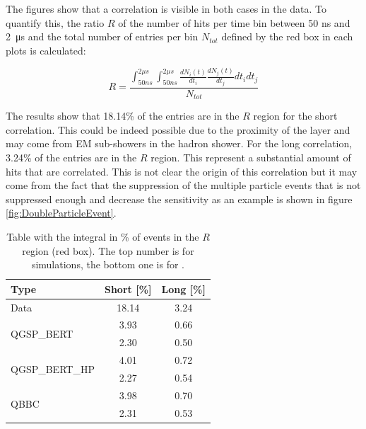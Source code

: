 The figures show that a correlation is visible in both cases in the data. To quantify this, the ratio $R$ of the number of hits per time bin between 50 ns and \SI{2}{\micro\second} and the total number of entries per bin $N_{tot}$ defined by the red box in each plots is calculated:

\begin{equation}
	R = \frac{\int_{50 ns}^{2 \mu s} \int_{50 ns}^{2 \mu s} \frac{dN_i(t)}{dt_i} \frac{dN_j(t)}{dt_j} dt_i dt_j}{N_{tot}}
\end{equation}

The results show that 18.14\% of the entries are in the $R$ region for the short correlation. This could be indeed possible due to the proximity of the layer and may come from EM sub-showers in the hadron shower. For the long correlation, 3.24\% of the entries are in the $R$ region. This represent a substantial amount of hits that are correlated. This is not clear the origin of this correlation but it may come from the fact that the suppression of the multiple particle events that is not suppressed enough and decrease the sensitivity as an example is shown in figure \ref{fig:DoubleParticleEvent}.

\begin{table}[htb!]
	\centering
	\renewcommand*{\arraystretch}{1.3}
	\caption{Table with the integral in \% of events in the $R$ region (red box). The top number is for \mokka simulations, the bottom one is for \ddhep.}
	\label{table:Correlation_DataSim}
	\begin{tabular}{@{} |p{5cm}|cc| @{}}
		\hline
		Type & Short [\%] & Long [\%]\\
		\hline
		\multirow{2}{*}{Data} & \multirow{2}{*}{18.14} & \multirow{2}{*}{3.24}\\ & &\\
		\hline
		\multirow{2}{*}{QGSP\_BERT} & 3.93 & 0.66\\ & 2.30 & 0.50\\
		\hline
		\multirow{2}{*}{QGSP\_BERT\_HP} & 4.01 & 0.72\\ & 2.27 & 0.54\\
		\hline
		\multirow{2}{*}{QBBC} & 3.98 & 0.70\\ & 2.31 & 0.53\\
		\hline
	\end{tabular}
\end{table}

